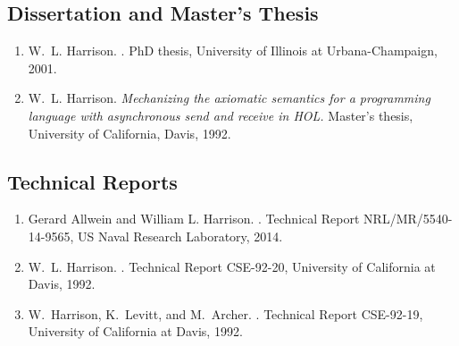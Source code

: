 \documentclass[12pt]{article} %
\begin{document}
\subsection*{Dissertation and Master's Thesis}


\begin{enumerate}[leftmargin=0.0mm]

\item
W.~L. Harrison.
.
\newblock PhD thesis, University of Illinois at Urbana-Champaign, 2001.

\item
W.~L. Harrison.
\newblock \emph{Mechanizing the axiomatic semantics for a programming language with
  asynchronous send and receive in {HOL}.}
\newblock Master's thesis, University of California, Davis, 1992.


\thispagestyle{fancyplain}
\fancyhf{}
\renewcommand{\headrulewidth}{0pt}
\cfoot{ \fancyplain{}{\thepage} }

\end{enumerate}

\subsection*{Technical Reports}



\begin{enumerate}[leftmargin=0.0mm]

\item
Gerard Allwein and William L. Harrison.
.
\newblock Technical Report NRL/MR/5540-14-9565, US Naval Research Laboratory, 2014. 

\item
W.~L. Harrison.
.
\newblock Technical Report CSE-92-20, University of California at Davis, 1992.


\item
W.~Harrison, K.~Levitt, and M.~Archer.
.
\newblock Technical Report CSE-92-19, University of California at Davis, 1992.

\end{enumerate}
\end{document}
